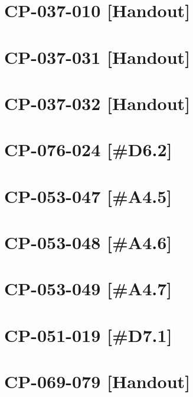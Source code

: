 \section{CP-037-010 [Handout]}\newpage
\section{CP-037-031 [Handout]}\newpage
\section{CP-037-032 [Handout]}\newpage
\section{CP-076-024 [\#D6.2]}\newpage

\setcounter{section}{0}

\section{CP-053-047 [\#A4.5]}\newpage
\section{CP-053-048 [\#A4.6]}\newpage
\section{CP-053-049 [\#A4.7]}\newpage
\section{CP-051-019 [\#D7.1]}\newpage
\section{CP-069-079 [Handout]}


